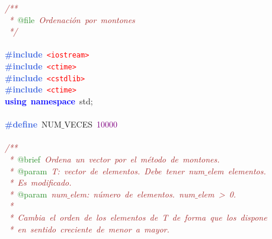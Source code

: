 \noindent
\mbox{}\textit{\textcolor{Brown}{/**}} \\
\mbox{}\textit{\textcolor{Brown}{\ *\ }}\textcolor{ForestGreen}{@file}\textit{\textcolor{Brown}{\ Ordenación\ por\ montones}} \\
\mbox{}\textit{\textcolor{Brown}{\ */}} \\
\mbox{} \\
\mbox{}\textbf{\textcolor{RoyalBlue}{\#include}}\ \texttt{\textcolor{Red}{\textless{}iostream\textgreater{}}} \\
\mbox{}\textbf{\textcolor{RoyalBlue}{\#include}}\ \texttt{\textcolor{Red}{\textless{}ctime\textgreater{}}} \\
\mbox{}\textbf{\textcolor{RoyalBlue}{\#include}}\ \texttt{\textcolor{Red}{\textless{}cstdlib\textgreater{}}} \\
\mbox{}\textbf{\textcolor{RoyalBlue}{\#include}}\ \texttt{\textcolor{Red}{\textless{}ctime\textgreater{}}} \\
\mbox{}\textbf{\textcolor{Blue}{using}}\ \textbf{\textcolor{Blue}{namespace}}\ std\textcolor{BrickRed}{;} \\
\mbox{} \\
\mbox{}\textbf{\textcolor{RoyalBlue}{\#define}}\ NUM$\_$VECES\ \textcolor{Purple}{10000} \\
\mbox{} \\
\mbox{}\textit{\textcolor{Brown}{/**}} \\
\mbox{}\textit{\textcolor{Brown}{\ *\ }}\textcolor{ForestGreen}{@brief}\textit{\textcolor{Brown}{\ Ordena\ un\ vector\ por\ el\ método\ de\ montones.}} \\
\mbox{}\textit{\textcolor{Brown}{\ *\ }}\textcolor{ForestGreen}{@param}\textit{\textcolor{Brown}{\ T:\ vector\ de\ elementos.\ Debe\ tener\ num$\_$elem\ elementos.}} \\
\mbox{}\textit{\textcolor{Brown}{\ *\ Es\ modificado.}} \\
\mbox{}\textit{\textcolor{Brown}{\ *\ }}\textcolor{ForestGreen}{@param}\textit{\textcolor{Brown}{\ num$\_$elem:\ número\ de\ elementos.\ num$\_$elem\ \textgreater{}\ 0.}} \\
\mbox{}\textit{\textcolor{Brown}{\ *\ }} \\
\mbox{}\textit{\textcolor{Brown}{\ *\ Cambia\ el\ orden\ de\ los\ elementos\ de\ T\ de\ forma\ que\ los\ dispone}} \\
\mbox{}\textit{\textcolor{Brown}{\ *\ en\ sentido\ creciente\ de\ menor\ a\ mayor.}} \\
